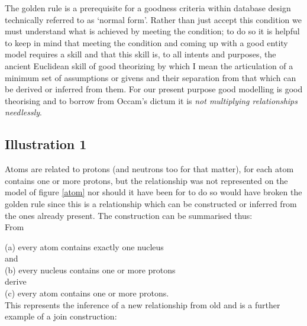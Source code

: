 \noindent The golden rule is a prerequisite for a goodness criteria within database design technically referred to as `normal form'. Rather than just accept this condition we must understand what is achieved by meeting the condition; to do so it is helpful to keep in mind that meeting the condition and coming up with a good entity model requires a skill and that this skill is, to all intents and purposes, the ancient Euclidean skill of good theorizing by which I mean the articulation of a minimum set of assumptions or givens and their separation from that which can be derived or inferred from them. For our present purpose good modelling is good theorising and to borrow from Occam's dictum it is \textit{not multiplying relationships needlessly}.    \\


\subsection{Illustration 1}
Atoms are related to protons (and neutrons too for that matter), for each atom contains one or more protons, but the relationship 
was not represented on the model of figure \ref{atom} nor should it have been for to do so would have broken the golden rule since this is a relationship which can be constructed or inferred from the ones already present. The construction can be summarised thus:\\
\noindent From\\
\setlength{\parindent}{3cm}

\indent (a) every atom contains exactly one nucleus\\

\noindent and\\

\indent (b) every nucleus contains one or more protons\\

\noindent derive\\

\indent (c) every atom contains one or more protons.\\

\noindent This represents the inference of a new relationship from old and is a further example of a join construction:\\

